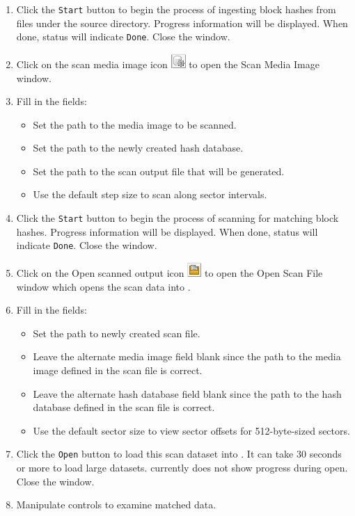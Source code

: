 \documentclass[11pt,fleqn]{article} %
\begin{document}
\begin{enumerate}
\begin{itemize}
  \end{itemize}
\item Click the \verb+Start+ button to begin the process of ingesting block hashes from files under the source directory. Progress information will be displayed. When done, status will indicate \verb+Done+. Close the window.
\item Click on the scan media image icon
\includegraphics[scale=.4]{screenshots/scan_media_image_icon}
to open the \sscope Scan Media Image window.
\item Fill in the fields:
  \begin{itemize}
  \item Set the path to the media image to be scanned.
  \item Set the path to the newly created hash database.
  \item Set the path to the scan output file that will be generated.
  \item Use the default step size to scan along sector intervals.
  \end{itemize}
\item Click the \verb+Start+ button to begin the process of scanning for matching block hashes. Progress information will be displayed. When done, status will indicate \verb+Done+. Close the window.
\item Click on the Open scanned output icon
\includegraphics[scale=.4]{screenshots/open_scanned_output_icon}
to open the Open Scan File window which opens the scan data into \sscope.
\item Fill in the fields:
  \begin{itemize}
  \item Set the path to newly created scan file.
  \item Leave the alternate media image field blank since the path to the media image defined in the scan file is correct.
  \item Leave the alternate hash database field blank since the path to the hash database defined in the scan file is correct.
  \item Use the default sector size to view sector offsets for 512-byte-sized sectors.
  \end{itemize}
\item Click the \verb+Open+ button to load this scan dataset into \sscope. It can take 30 seconds or more to load large datasets. \sscope currently does not show progress during open. Close the window.
\item Manipulate \sscope controls to examine matched data.
\end{enumerate}
\end{document}
